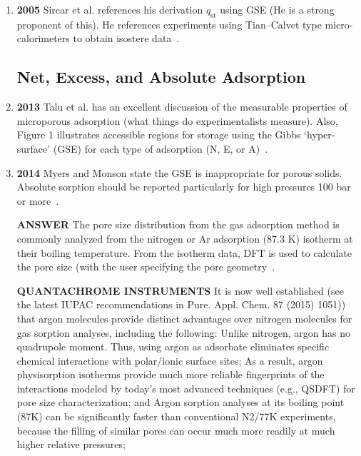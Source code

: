 \documentclass[letterpaper,twocolumn,amsmath,amssymb,jcp,aps,10pt]{revtex4-1}
\begin{document}
\begin{enumerate}
\item {\textbf{2005}} Sircar et al. references his derivation $q_\text{st}$ using GSE (He is a strong proponent of this). He references experiments using Tian–Calvet type micro-calorimeters to obtain isostere data~\cite{sircar2005heat}.

\subsection{Net, Excess, and Absolute Adsorption}
\item {\textbf{2013}} Talu et al. has an excellent discussion of the measurable properties of microporous adsorption (what things do experimentalists measure). Also, Figure 1 illustrates accessible regions for storage using the Gibbs `hyper-surface' (GSE) for each type of adsorption (N, E, or A)~\cite{talu2013net}.

\item {\textbf{2014}} Myers and Monson state the GSE is inappropriate for porous solids. Absolute sorption should be reported particularly for high pressures 100 bar or more~\cite{myers2014physical}.

\textbf{ANSWER} The pore size distribution from the gas adsorption method is commonly analyzed from the nitrogen or Ar adsorption (87.3 K) isotherm at their boiling temperature. From the isotherm data, DFT is used to calculate the pore size (with the user specifying the pore geometry~\cite{groen2003pore}.

\textbf{QUANTACHROME INSTRUMENTS}
It is now well established (see the latest IUPAC recommendations in Pure. Appl. Chem. 87 (2015) 1051)) that argon molecules provide distinct advantages over nitrogen molecules for gas sorption analyses, including the following:
Unlike nitrogen, argon has no quadrupole moment. Thus, using argon as adsorbate eliminates specific chemical interactions with polar/ionic surface sites;
As a result, argon physisorption isotherms provide much more reliable fingerprints of the interactions modeled by today’s most advanced techniques (e.g., QSDFT) for pore size characterization; and
Argon sorption analyses at its boiling point (87K) can be significantly faster than conventional N2/77K experiments, because the filling of similar pores can occur much more readily at much higher relative pressures;


\end{enumerate}
\end{document}
